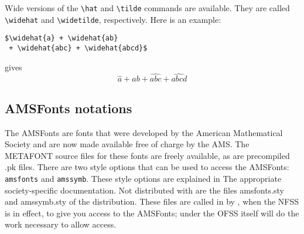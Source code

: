 Wide versions of the \verb+\hat+ and \verb+\tilde+ commands are available.
They are called \verb+\widehat+ and \verb+\widetilde+, respectively.
Here is an example:
\begin{verbatim}
$\widehat{a} + \widehat{ab}
 + \widehat{abc} + \widehat{abcd}$
\end{verbatim}
gives
\[
\widehat{a} + \widehat{ab} + \widehat{abc} + \widehat{abcd}
\]


\subsection{AMSFonts notations}
\label{AMSFonts,notations}


The AMSFonts are fonts that were developed by the American Mathematical Society
and are now made available free of charge by the AMS. The METAFONT source
files for these
fonts are freely available, as are precompiled .pk files. There are two style
options that can be used to access the AMSFonts:
\verb+amsfonts+ and \verb+amssymb+. These style options are explained in
The appropriate society-specific documentation. Not distributed
with \REVTeX{} are the files amsfonts.sty and amssymb.sty of the
\AmSLaTeX{} distribution.
These files are called in by \REVTeX{}, when the NFSS is in effect,
to give you access
to the AMSFonts; under the OFSS \REVTeX{} itself will do the work necessary
to allow access.


